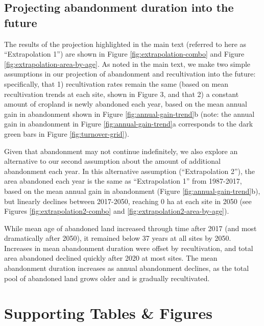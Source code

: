 \documentclass[9pt,lineno]{pnas-new}
\begin{document}
\hypertarget{section-extrapolation-si}{%
\subsection{Projecting abandonment duration into the future}\label{section-extrapolation-si}}

The results of the projection highlighted in the main text (referred to here as ``Extrapolation 1'') are shown in Figure \ref{fig:extrapolation-combo} and Figure \ref{fig:extrapolation-area-by-age}.
As noted in the main text, we make two simple assumptions in our projection of abandonment and recultivation into the future: specifically, that 1) recultivation rates remain the same (based on mean recultivation trends at each site, shown in Figure 3, and that 2) a constant amount of cropland is newly abandoned each year, based on the mean annual gain in abandonment shown in Figure \ref{fig:annual-gain-trend}b (note: the annual gain in abandonment in Figure \ref{fig:annual-gain-trend}a corresponds to the dark green bars in Figure \ref{fig:turnover-grid}).

Given that abandonment may not continue indefinitely, we also explore an alternative to our second assumption about the amount of additional abandonment each year.
In this alternative assumption (``Extrapolation 2''), the area abandoned each year is the same as ``Extrapolation 1'' from 1987-2017, based on the mean annual gain in abandonment (Figure \ref{fig:annual-gain-trend}b), but linearly declines between 2017-2050, reaching 0 ha at each site in 2050 (see Figures \ref{fig:extrapolation2-combo} and \ref{fig:extrapolation2-area-by-age}).

While mean age of abandoned land increased through time after 2017 (and most dramatically after 2050), it remained below 37 years at all sites by 2050.
Increases in mean abandonment duration were offset by recultivation, and total area abandoned declined quickly after 2020 at most sites.
The mean abandonment duration increases as annual abandonment declines, as the total pool of abandoned land grows older and is gradually recultivated.

\newpage

\hypertarget{supporting-tables-figures}{%
\section{Supporting Tables \& Figures}\label{supporting-tables-figures}}
\end{document}

